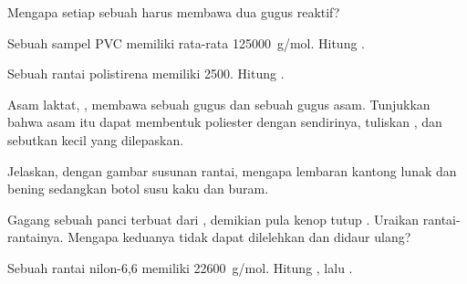 \begin{exercise}[$\star$]\label{exo:g12:polymers:5}
Mengapa setiap  sebuah  harus membawa dua gugus
reaktif?
\end{exercise}

\begin{exercise}[$\star\star$]\label{exo:g12:polymers:6}
Sebuah sampel PVC memiliki  rata-rata \qty{125000}{g/mol}.
Hitung .
\end{exercise}

\begin{exercise}[$\star\star$]\label{exo:g12:polymers:7}
Sebuah rantai polistirena memiliki  2500. Hitung
.
\end{exercise}

\begin{exercise}[$\star\star$]\label{exo:g12:polymers:8}
Asam laktat, , membawa sebuah gugus  dan
sebuah gugus asam. Tunjukkan bahwa asam itu dapat membentuk poliester
dengan sendirinya, tuliskan , dan sebutkan  kecil
yang dilepaskan.
\end{exercise}

\begin{exercise}[$\star\star$]\label{exo:g12:polymers:9}
Jelaskan, dengan gambar susunan rantai, mengapa lembaran kantong lunak
dan bening sedangkan botol susu kaku dan buram.
\end{exercise}

\begin{exercise}[$\star\star$]\label{exo:g12:polymers:10}
Gagang sebuah panci terbuat dari , demikian pula kenop tutup
. Uraikan rantai-rantainya. Mengapa keduanya tidak dapat
dilelehkan dan didaur ulang?
\end{exercise}

\begin{exercise}[$\star\star$]\label{exo:g12:polymers:11}
Sebuah rantai nilon-6,6 memiliki  \qty{22600}{g/mol}. Hitung
  , lalu .
\end{exercise}

